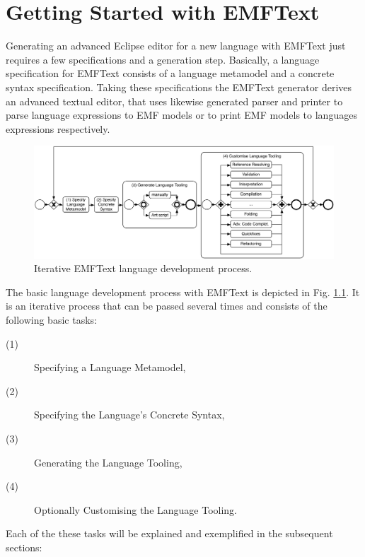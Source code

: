 \chapter{Getting Started with EMFText}

	Generating an advanced Eclipse editor for a new language with EMFText just
	requires a few specifications and a generation step. 
	Basically, a language specification for EMFText consists of a language
	metamodel and a concrete syntax specification. Taking these specifications the
	EMFText generator derives an advanced textual editor, that uses likewise generated
	parser and printer to parse language expressions to EMF models or to print EMF models to
	languages expressions respectively. 
	
	\begin{figure}[ht]
	\centering
		\includegraphics[scale=0.5]{figures/process}
	\caption{Iterative EMFText language development process.}
	\label{fig:process}
	\end{figure}
	
	\noindent The basic language development process with EMFText is depicted in
	Fig. \ref{fig:process}. It is an iterative process that can be passed several
	times and consists of the following basic tasks:
	\begin{description}
	  \item[(1)] Specifying a Language Metamodel,
	  \item[(2)] Specifying the Language's Concrete Syntax,
	  \item[(3)] Generating the Language Tooling,
	  \item[(4)] Optionally Customising the Language Tooling.
	\end{description}
	
	
	
	Each of the these tasks
	will be explained and exemplified in the subsequent sections:
	
